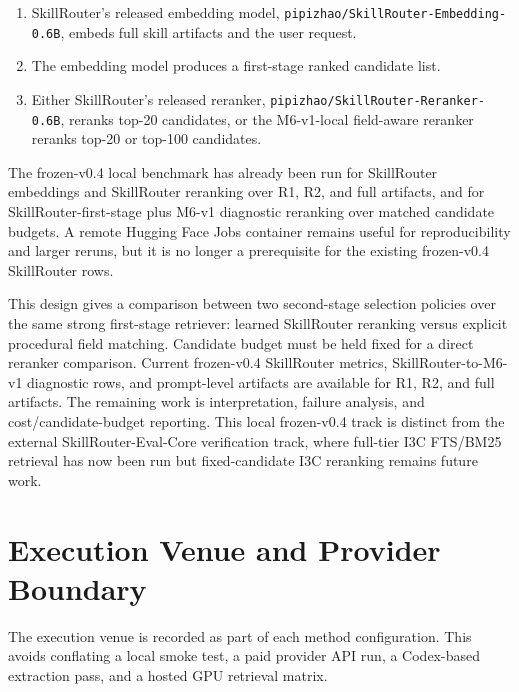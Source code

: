 \begin{enumerate}
  \item SkillRouter's released embedding model, \texttt{pipizhao/SkillRouter-Embedding-0.6B}, embeds full skill artifacts and the user request.
  \item The embedding model produces a first-stage ranked candidate list.
  \item Either SkillRouter's released reranker, \texttt{pipizhao/SkillRouter-Reranker-0.6B}, reranks top-20 candidates, or the M6-v1-local field-aware reranker reranks top-20 or top-100 candidates.
\end{enumerate}

The frozen-v0.4 local benchmark has already been run for SkillRouter embeddings and SkillRouter reranking over R1, R2, and full artifacts, and for SkillRouter-first-stage plus M6-v1 diagnostic reranking over matched candidate budgets. A remote Hugging Face Jobs container remains useful for reproducibility and larger reruns, but it is no longer a prerequisite for the existing frozen-v0.4 SkillRouter rows.

This design gives a comparison between two second-stage selection policies over the same strong first-stage retriever: learned SkillRouter reranking versus explicit procedural field matching. Candidate budget must be held fixed for a direct reranker comparison. Current frozen-v0.4 SkillRouter metrics, SkillRouter-to-M6-v1 diagnostic rows, and prompt-level artifacts are available for R1, R2, and full artifacts. The remaining work is interpretation, failure analysis, and cost/candidate-budget reporting. This local frozen-v0.4 track is distinct from the external SkillRouter-Eval-Core verification track, where full-tier I3C FTS/BM25 retrieval has now been run but fixed-candidate I3C reranking remains future work.

\section{Execution Venue and Provider Boundary}

The execution venue is recorded as part of each method configuration. This avoids conflating a local smoke test, a paid provider API run, a Codex-based extraction pass, and a hosted GPU retrieval matrix.

